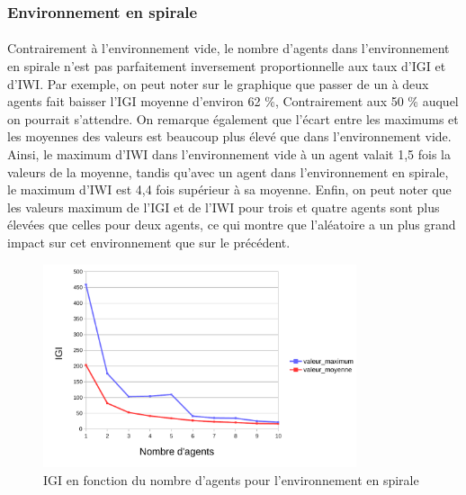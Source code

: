 \documentclass{article}
\begin{document}
        \subsubsection{Environnement en spirale}
        \paragraph{} Contrairement à l'environnement vide, le nombre d'agents dans l'environnement en spirale n'est pas parfaitement inversement proportionnelle aux taux d'IGI et d'IWI.
        Par exemple, on peut noter sur le graphique que passer de un à deux agents fait baisser l'IGI moyenne d'environ 62 \%, Contrairement aux 50 \% auquel on pourrait s'attendre.
        On remarque également que l'écart entre les maximums et les moyennes des valeurs est beaucoup plus élevé que dans l'environnement vide. Ainsi, le maximum d'IWI dans l'environnement vide à un agent valait 1,5 fois la valeurs de la moyenne, tandis qu'avec un agent dans l'environnement en spirale, le maximum d'IWI est 4,4 fois supérieur à sa moyenne.
        Enfin, on peut noter que les valeurs maximum de l'IGI et de l'IWI pour trois et quatre agents sont plus élevées que celles pour deux agents, ce qui montre que l'aléatoire a un plus grand impact sur cet environnement que sur le précédent.
            \begin{figure}[!h]
                \begin{center}
                    \includegraphics[width = 0.82\textwidth]{graphes pdf/variance tortues IGI spirale.pdf}
                    \caption{IGI en fonction du nombre d'agents pour l'environnement en spirale}
                \end{center}
            \end{figure}
\end{document}

